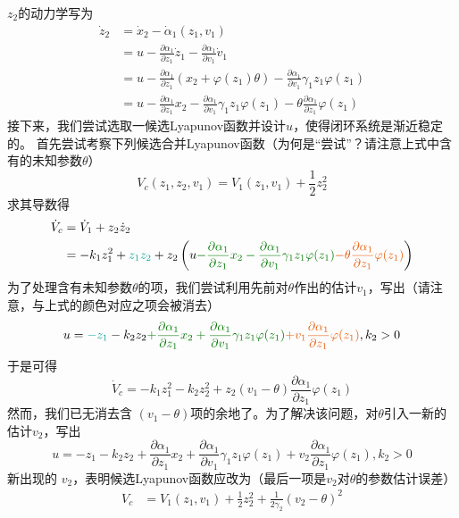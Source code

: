 $z_2$的动力学写为
  \begin{align*}
  \dot{z}_2 & = \dot{x}_2 - \dot{\alpha}_1 (z_1, v_1)\\
  & = u - \frac{\partial \alpha_1}{\partial z_1} \dot{z}_1 - \frac{\partial
  \alpha_1}{\partial v_1} \dot{v}_1\\
  & = u - \frac{\partial \alpha_1}{\partial z_1} (x_2 + \varphi (z_1)
  \theta) - \frac{\partial \alpha_1}{\partial v_1} \gamma_1 z_1 \varphi
  (z_1)\\
  & = u - \frac{\partial \alpha_1}{\partial z_1} x_2 - \frac{\partial
  \alpha_1}{\partial v_1} \gamma_1 z_1 \varphi (z_1) - \theta \frac{\partial
  \alpha_1}{\partial z_1} \varphi (z_1)
\end{align*}
接下来，我们尝试选取一候选Lyapunov函数并设计$u$，使得闭环系统是渐近稳定的。
首先尝试考察下列候选合并Lyapunov函数（为何是“尝试”？请注意上式中含有的未知参数$\theta$）
\[ V_c (z_1, z_2, v_1) = V_1 (z_1, v_1) + \frac{1}{2} z^2_2 \]
求其导数得
\begin{align*}
  \dot{V}_c & = \dot{V}_1 + z_2 \dot{z}_2\\
  & = - k_1 z^2_1 + \textcolor{third}{z_1 z_2} + z_2 \left( u \textcolor{structurecolor}{- \frac{\partial
  \alpha_1}{\partial z_1} x_2 - \frac{\partial \alpha_1}{\partial v_1}
  \gamma_1 z_1 \varphi (z_1)} \textcolor{second}{- \theta \frac{\partial \alpha_1}{\partial z_1}  \varphi (z_1)} \right)
\end{align*}
为了处理含有未知参数$\theta$的项，我们尝试利用先前对$\theta$作出的估计$v_1$，写出（请注意，与上式的颜色对应之项会被消去）
\[ u = \textcolor{third}{- z_1} - k_2z_2 \textcolor{structurecolor}{+ \frac{\partial \alpha_1}{\partial z_1} x_2 +
   \frac{\partial \alpha_1}{\partial v_1} \gamma_1 z_1 \varphi (z_1)} \textcolor{second}{+ v_1
   \frac{\partial \alpha_1}{\partial z_1} \varphi (z_1)}, k_2 > 0 \]
于是可得
\[ \dot{V}_c = - k_1 z^2_1 - k_2 z^2_2 + z_2 (v_1 - \theta) \frac{\partial
   \alpha_1}{\partial z_1} \varphi (z_1) \]
然而，我们已无消去含 $(v_1 - \theta)$项的余地了。为了解决该问题，对$\theta$引入一新的估计$v_2$，写出
\[ u = - z_1 - k_2z_2 + \frac{\partial \alpha_1}{\partial z_1} x_2 +
   \frac{\partial \alpha_1}{\partial v_1} \gamma_1 z_1 \varphi (z_1) + v_2
   \frac{\partial \alpha_1}{\partial z_1} \varphi (z_1), k_2 > 0 \]
新出现的 $v_2$，表明候选Lyapunov函数应改为（最后一项是$v_2$对$\theta$的参数估计误差）
\begin{align*}
  V_c & = V_1 (z_1, v_1) + \frac{1}{2} z^2_2 + \frac{1}{2 \gamma_2} (v_2 -
  \theta)^2
\end{align*}

